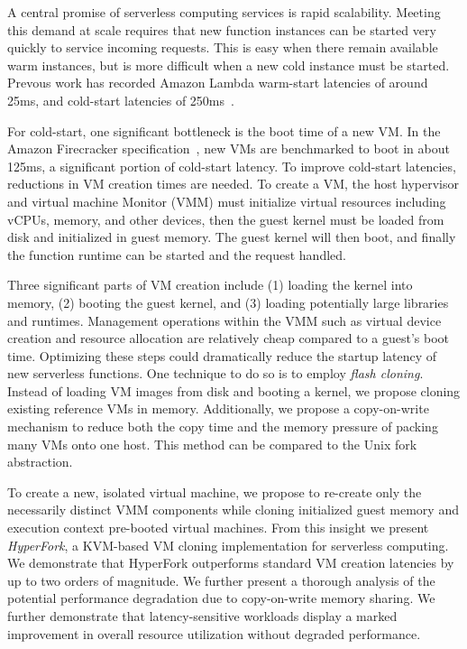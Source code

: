 A central promise of serverless computing
services is rapid scalability. Meeting this demand at scale requires that new
function instances can be started very quickly to service incoming requests.
This is easy when there remain available warm instances, but is more difficult
when a new cold instance must be started. Prevous work has recorded Amazon
Lambda warm-start latencies of around 25ms, and cold-start latencies of
250ms~\cite{peeking}.

For cold-start, one significant bottleneck is the boot time of a new VM. In the
Amazon Firecracker specification~\cite{firecracker-spec}, new VMs are
benchmarked to boot in about 125ms, a significant portion of cold-start
latency. To improve cold-start latencies, reductions in VM creation times are
needed. To create a VM, the host hypervisor and virtual machine Monitor (VMM)
must initialize virtual resources including vCPUs, memory, and other devices,
then the guest kernel must be loaded from disk and initialized in guest memory.
The guest kernel will then boot, and finally the function runtime can be
started and the request handled.

 Three significant parts of VM creation include (1)
loading the kernel into memory, (2) booting the guest kernel, and (3) loading
potentially large libraries and runtimes. Management operations within the VMM
such as virtual device creation and resource allocation are relatively cheap
compared to a guest's boot time. Optimizing these steps could dramatically
reduce the startup latency of new serverless functions. One technique to do so
is to employ \emph{flash cloning}. Instead of loading VM images from disk and
booting a kernel, we propose cloning existing reference VMs in memory.
Additionally, we propose a copy-on-write mechanism to reduce both the copy time
and the memory pressure of packing many VMs onto one host. This method can be
compared to the Unix fork abstraction.

 To create a new, isolated virtual machine, we propose to
re-create only the necessarily distinct VMM components while cloning
initialized guest memory and execution context pre-booted virtual machines.
From this insight we present \emph{HyperFork}, a KVM-based VM cloning
implementation for serverless computing. We demonstrate that HyperFork
outperforms standard VM creation latencies by up to two orders of magnitude. We
further present a thorough analysis of the potential performance degradation
due to copy-on-write memory sharing. We further demonstrate that
latency-sensitive workloads display a marked improvement in overall resource
utilization without degraded performance.

